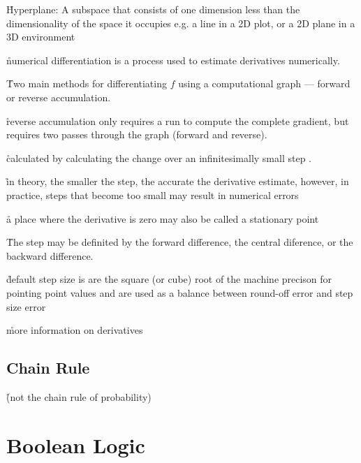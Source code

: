 

\r{Hyperplane: A subspace that consists of one dimension less than the dimensionality of the space it occupies e.g. a line in a 2D plot, or a 2D plane in a 3D environment}

\r{numerical differentiation is a process used to estimate derivatives numerically.}

\r{Two main methods for differentiating $f$ using a computational graph --- forward or reverse accumulation.}

\r{reverse accumulation\cite{linnainmaa1970representation} only requires a run to compute the complete gradient, but requires two passes through the graph (forward and reverse). }


\r{calculated by calculating the change over an infinitesimally small step .}

\r{in theory, the smaller the step, the accurate the derivative estimate, however, in practice, steps that become too small may result in numerical errors}

\r{a place where the derivative is zero may also be called a stationary point}

\r{The step may be definited by the forward difference, the central diference, or the backward difference. }

\r{default step size is are the square (or cube) root of the machine precison for pointing point values\cite{kochenderfer2019algorithms} and are used as a balance between round-off error and step size error }

\r{more information on derivatives\cite{griewank2008evaluating}}

\subsection{Chain Rule}

\r{(not the chain rule of probability)}



\section{Boolean Logic}


